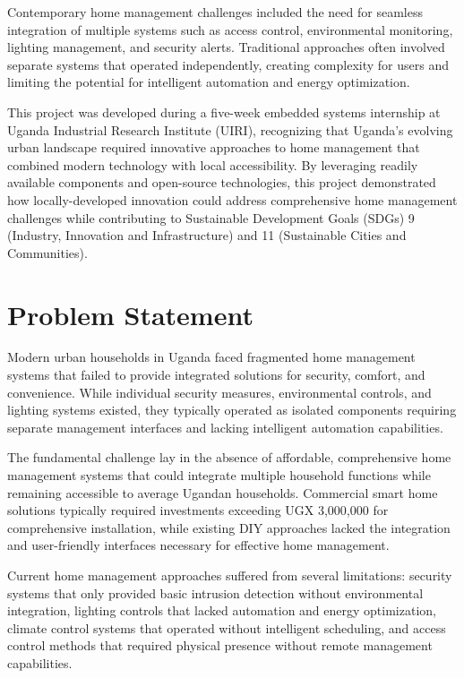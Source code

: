 \documentclass[12pt,a4paper]{report}
\begin{document}
\noindent Contemporary home management challenges included the need for seamless integration of multiple systems such as access control, environmental monitoring, lighting management, and security alerts. Traditional approaches often involved separate systems that operated independently, creating complexity for users and limiting the potential for intelligent automation and energy optimization.

\noindent This project was developed during a five-week embedded systems internship at Uganda Industrial Research Institute (UIRI), recognizing that Uganda's evolving urban landscape required innovative approaches to home management that combined modern technology with local accessibility. By leveraging readily available components and open-source technologies, this project demonstrated how locally-developed innovation could address comprehensive home management challenges while contributing to Sustainable Development Goals (SDGs) 9 (Industry, Innovation and Infrastructure) and 11 (Sustainable Cities and Communities).

\section{Problem Statement}

\noindent Modern urban households in Uganda faced fragmented home management systems that failed to provide integrated solutions for security, comfort, and convenience. While individual security measures, environmental controls, and lighting systems existed, they typically operated as isolated components requiring separate management interfaces and lacking intelligent automation capabilities.

\noindent The fundamental challenge lay in the absence of affordable, comprehensive home management systems that could integrate multiple household functions while remaining accessible to average Ugandan households. Commercial smart home solutions typically required investments exceeding UGX 3,000,000 for comprehensive installation, while existing DIY approaches lacked the integration and user-friendly interfaces necessary for effective home management.

\noindent Current home management approaches suffered from several limitations: security systems that only provided basic intrusion detection without environmental integration, lighting controls that lacked automation and energy optimization, climate control systems that operated without intelligent scheduling, and access control methods that required physical presence without remote management capabilities.
\end{document}
